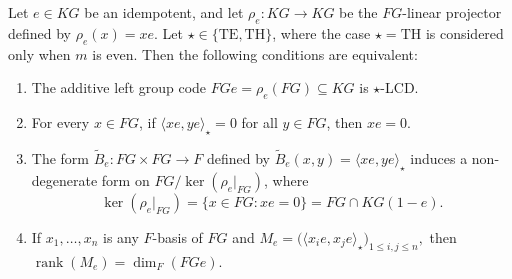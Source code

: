 \documentclass[11pt]{article}
\begin{document}
\begin{theorem}\label{thm:rhoe-lcd}
Let $e\in KG$ be an idempotent, and let $\rho_e:KG\longrightarrow KG$ be the $FG$-linear projector defined by $\rho_e(x)=xe$. Let $\star\in\{\mathrm{TE},\mathrm{TH}\}$, where the case
$\star=\mathrm{TH}$ is considered only when $m$ is even. Then the following conditions are equivalent:
\begin{enumerate}
    \item The additive left group code $FGe=\rho_e(FG)\subseteq KG$ is $\star$-LCD.

    \item For every $x\in FG$, if $\langle xe,ye\rangle_\star=0$ for all $y\in FG$, then $xe=0$.

    \item The form $\widetilde{B}_e:FG\times FG\longrightarrow F$ defined by
    $
    \widetilde{B}_e(x,y)=\langle xe,ye\rangle_\star
    $
    induces a non-degenerate form on $FG/\ker(\rho_e|_{FG})$, where
    $$
    \ker(\rho_e|_{FG})=\{x\in FG:xe=0\}=FG\cap KG(1-e).
    $$

    \item If $x_1,\dots,x_n$ is any $F$-basis of $FG$ and
    $
    M_e=\bigl(\langle x_i e,x_j e\rangle_\star\bigr)_{1\le i,j\le n},
    $
    then
    $
    \operatorname{rank}(M_e)=\dim_F(FGe).
    $
\end{enumerate}
\end{theorem}
\end{document}
